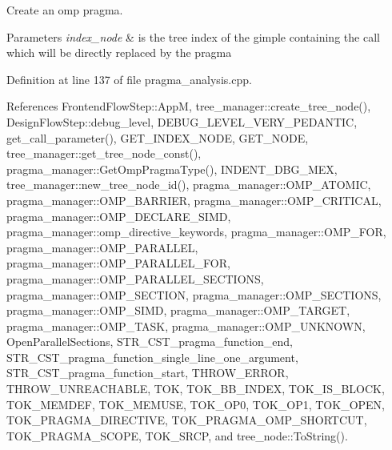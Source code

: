 Create an omp pragma. 


\begin{DoxyParams}{Parameters}
{\em index\+\_\+node} & is the tree index of the gimple containing the call which will be directly replaced by the pragma \\
\hline
\end{DoxyParams}


Definition at line 137 of file pragma\+\_\+analysis.\+cpp.



References Frontend\+Flow\+Step\+::\+AppM, tree\+\_\+manager\+::create\+\_\+tree\+\_\+node(), Design\+Flow\+Step\+::debug\+\_\+level, D\+E\+B\+U\+G\+\_\+\+L\+E\+V\+E\+L\+\_\+\+V\+E\+R\+Y\+\_\+\+P\+E\+D\+A\+N\+T\+IC, get\+\_\+call\+\_\+parameter(), G\+E\+T\+\_\+\+I\+N\+D\+E\+X\+\_\+\+N\+O\+DE, G\+E\+T\+\_\+\+N\+O\+DE, tree\+\_\+manager\+::get\+\_\+tree\+\_\+node\+\_\+const(), pragma\+\_\+manager\+::\+Get\+Omp\+Pragma\+Type(), I\+N\+D\+E\+N\+T\+\_\+\+D\+B\+G\+\_\+\+M\+EX, tree\+\_\+manager\+::new\+\_\+tree\+\_\+node\+\_\+id(), pragma\+\_\+manager\+::\+O\+M\+P\+\_\+\+A\+T\+O\+M\+IC, pragma\+\_\+manager\+::\+O\+M\+P\+\_\+\+B\+A\+R\+R\+I\+ER, pragma\+\_\+manager\+::\+O\+M\+P\+\_\+\+C\+R\+I\+T\+I\+C\+AL, pragma\+\_\+manager\+::\+O\+M\+P\+\_\+\+D\+E\+C\+L\+A\+R\+E\+\_\+\+S\+I\+MD, pragma\+\_\+manager\+::omp\+\_\+directive\+\_\+keywords, pragma\+\_\+manager\+::\+O\+M\+P\+\_\+\+F\+OR, pragma\+\_\+manager\+::\+O\+M\+P\+\_\+\+P\+A\+R\+A\+L\+L\+EL, pragma\+\_\+manager\+::\+O\+M\+P\+\_\+\+P\+A\+R\+A\+L\+L\+E\+L\+\_\+\+F\+OR, pragma\+\_\+manager\+::\+O\+M\+P\+\_\+\+P\+A\+R\+A\+L\+L\+E\+L\+\_\+\+S\+E\+C\+T\+I\+O\+NS, pragma\+\_\+manager\+::\+O\+M\+P\+\_\+\+S\+E\+C\+T\+I\+ON, pragma\+\_\+manager\+::\+O\+M\+P\+\_\+\+S\+E\+C\+T\+I\+O\+NS, pragma\+\_\+manager\+::\+O\+M\+P\+\_\+\+S\+I\+MD, pragma\+\_\+manager\+::\+O\+M\+P\+\_\+\+T\+A\+R\+G\+ET, pragma\+\_\+manager\+::\+O\+M\+P\+\_\+\+T\+A\+SK, pragma\+\_\+manager\+::\+O\+M\+P\+\_\+\+U\+N\+K\+N\+O\+WN, Open\+Parallel\+Sections, S\+T\+R\+\_\+\+C\+S\+T\+\_\+pragma\+\_\+function\+\_\+end, S\+T\+R\+\_\+\+C\+S\+T\+\_\+pragma\+\_\+function\+\_\+single\+\_\+line\+\_\+one\+\_\+argument, S\+T\+R\+\_\+\+C\+S\+T\+\_\+pragma\+\_\+function\+\_\+start, T\+H\+R\+O\+W\+\_\+\+E\+R\+R\+OR, T\+H\+R\+O\+W\+\_\+\+U\+N\+R\+E\+A\+C\+H\+A\+B\+LE, T\+OK, T\+O\+K\+\_\+\+B\+B\+\_\+\+I\+N\+D\+EX, T\+O\+K\+\_\+\+I\+S\+\_\+\+B\+L\+O\+CK, T\+O\+K\+\_\+\+M\+E\+M\+D\+EF, T\+O\+K\+\_\+\+M\+E\+M\+U\+SE, T\+O\+K\+\_\+\+O\+P0, T\+O\+K\+\_\+\+O\+P1, T\+O\+K\+\_\+\+O\+P\+EN, T\+O\+K\+\_\+\+P\+R\+A\+G\+M\+A\+\_\+\+D\+I\+R\+E\+C\+T\+I\+VE, T\+O\+K\+\_\+\+P\+R\+A\+G\+M\+A\+\_\+\+O\+M\+P\+\_\+\+S\+H\+O\+R\+T\+C\+UT, T\+O\+K\+\_\+\+P\+R\+A\+G\+M\+A\+\_\+\+S\+C\+O\+PE, T\+O\+K\+\_\+\+S\+R\+CP, and tree\+\_\+node\+::\+To\+String().



